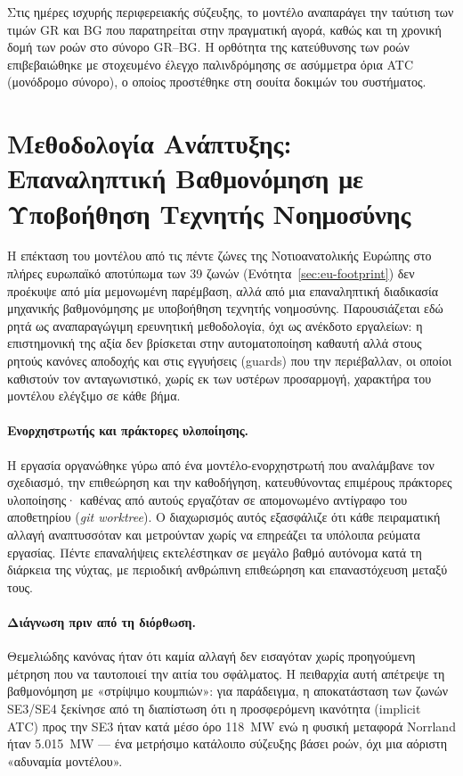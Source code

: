 Στις ημέρες ισχυρής περιφερειακής σύζευξης, το μοντέλο αναπαράγει την ταύτιση των τιμών GR και BG που παρατηρείται στην πραγματική αγορά, καθώς και τη χρονική δομή των ροών στο σύνορο GR--BG. Η ορθότητα της κατεύθυνσης των ροών επιβεβαιώθηκε με στοχευμένο έλεγχο παλινδρόμησης σε ασύμμετρα όρια ATC (μονόδρομο σύνορο), ο οποίος προστέθηκε στη σουίτα δοκιμών του συστήματος.


\section{Μεθοδολογία Ανάπτυξης: Επαναληπτική Βαθμονόμηση με Υποβοήθηση Τεχνητής Νοημοσύνης}
\label{sec:ai-assisted-workflow}

Η επέκταση του μοντέλου από τις πέντε ζώνες της Νοτιοανατολικής Ευρώπης στο πλήρες ευρωπαϊκό αποτύπωμα των 39 ζωνών (Ενότητα~\ref{sec:eu-footprint}) δεν προέκυψε από μία μεμονωμένη παρέμβαση, αλλά από μια επαναληπτική διαδικασία μηχανικής βαθμονόμησης με υποβοήθηση τεχνητής νοημοσύνης. Παρουσιάζεται εδώ ρητά ως αναπαραγώγιμη ερευνητική μεθοδολογία, όχι ως ανέκδοτο εργαλείων: η επιστημονική της αξία δεν βρίσκεται στην αυτοματοποίηση καθαυτή αλλά στους ρητούς κανόνες αποδοχής και στις εγγυήσεις (guards) που την περιέβαλλαν, οι οποίοι καθιστούν τον ανταγωνιστικό, χωρίς εκ των υστέρων προσαρμογή, χαρακτήρα του μοντέλου ελέγξιμο σε κάθε βήμα.

\paragraph{Ενορχηστρωτής και πράκτορες υλοποίησης.}
Η εργασία οργανώθηκε γύρω από ένα μοντέλο-ενορχηστρωτή που αναλάμβανε τον σχεδιασμό, την επιθεώρηση και την καθοδήγηση, κατευθύνοντας επιμέρους πράκτορες υλοποίησης· καθένας από αυτούς εργαζόταν σε απομονωμένο αντίγραφο του αποθετηρίου (\emph{git worktree}). Ο διαχωρισμός αυτός εξασφάλιζε ότι κάθε πειραματική αλλαγή αναπτυσσόταν και μετρούνταν χωρίς να επηρεάζει τα υπόλοιπα ρεύματα εργασίας. Πέντε επαναλήψεις εκτελέστηκαν σε μεγάλο βαθμό αυτόνομα κατά τη διάρκεια της νύχτας, με περιοδική ανθρώπινη επιθεώρηση και επαναστόχευση μεταξύ τους.

\paragraph{Διάγνωση πριν από τη διόρθωση.}
Θεμελιώδης κανόνας ήταν ότι καμία αλλαγή δεν εισαγόταν χωρίς προηγούμενη μέτρηση που να ταυτοποιεί την αιτία του σφάλματος. Η πειθαρχία αυτή απέτρεψε τη βαθμονόμηση με «στρίψιμο κουμπιών»: για παράδειγμα, η αποκατάσταση των ζωνών SE3/SE4 ξεκίνησε από τη διαπίστωση ότι η προσφερόμενη ικανότητα (implicit ATC) προς την SE3 ήταν κατά μέσο όρο 118~MW ενώ η φυσική μεταφορά Norrland ήταν 5.015~MW --- ένα μετρήσιμο κατάλοιπο σύζευξης βάσει ροών, όχι μια αόριστη «αδυναμία μοντέλου».

